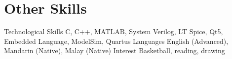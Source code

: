 \documentclass{myresume}
\begin{document}
\section{Other Skills~\hrulefill}
%
\cvEntryTwo
{Technological Skills}
{}
{C, C++, MATLAB, System Verilog, LT Spice, Qt5, Embedded Language, ModelSim, Quartus\newline}
%
\cvEntryTwo
{Languages}
{}
{English (Advanced), Mandarin (Native), Malay (Native)\newline}
%
\cvEntryTwo
{Interest}
{}
{Basketball, reading, drawing}
\end{document}
